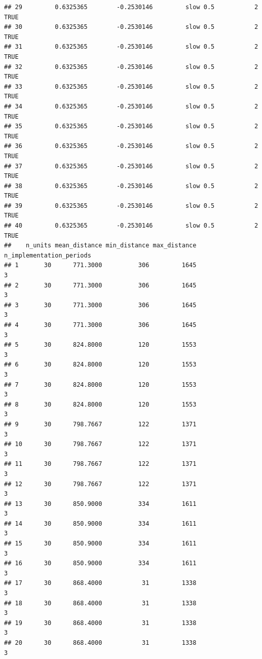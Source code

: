 \documentclass[
]{article}
\begin{document}
\begin{verbatim}
## 29         0.6325365        -0.2530146         slow 0.5           2    TRUE
## 30         0.6325365        -0.2530146         slow 0.5           2    TRUE
## 31         0.6325365        -0.2530146         slow 0.5           2    TRUE
## 32         0.6325365        -0.2530146         slow 0.5           2    TRUE
## 33         0.6325365        -0.2530146         slow 0.5           2    TRUE
## 34         0.6325365        -0.2530146         slow 0.5           2    TRUE
## 35         0.6325365        -0.2530146         slow 0.5           2    TRUE
## 36         0.6325365        -0.2530146         slow 0.5           2    TRUE
## 37         0.6325365        -0.2530146         slow 0.5           2    TRUE
## 38         0.6325365        -0.2530146         slow 0.5           2    TRUE
## 39         0.6325365        -0.2530146         slow 0.5           2    TRUE
## 40         0.6325365        -0.2530146         slow 0.5           2    TRUE
##    n_units mean_distance min_distance max_distance n_implementation_periods
## 1       30      771.3000          306         1645                        3
## 2       30      771.3000          306         1645                        3
## 3       30      771.3000          306         1645                        3
## 4       30      771.3000          306         1645                        3
## 5       30      824.8000          120         1553                        3
## 6       30      824.8000          120         1553                        3
## 7       30      824.8000          120         1553                        3
## 8       30      824.8000          120         1553                        3
## 9       30      798.7667          122         1371                        3
## 10      30      798.7667          122         1371                        3
## 11      30      798.7667          122         1371                        3
## 12      30      798.7667          122         1371                        3
## 13      30      850.9000          334         1611                        3
## 14      30      850.9000          334         1611                        3
## 15      30      850.9000          334         1611                        3
## 16      30      850.9000          334         1611                        3
## 17      30      868.4000           31         1338                        3
## 18      30      868.4000           31         1338                        3
## 19      30      868.4000           31         1338                        3
## 20      30      868.4000           31         1338                        3

\end{verbatim}
\end{document}
